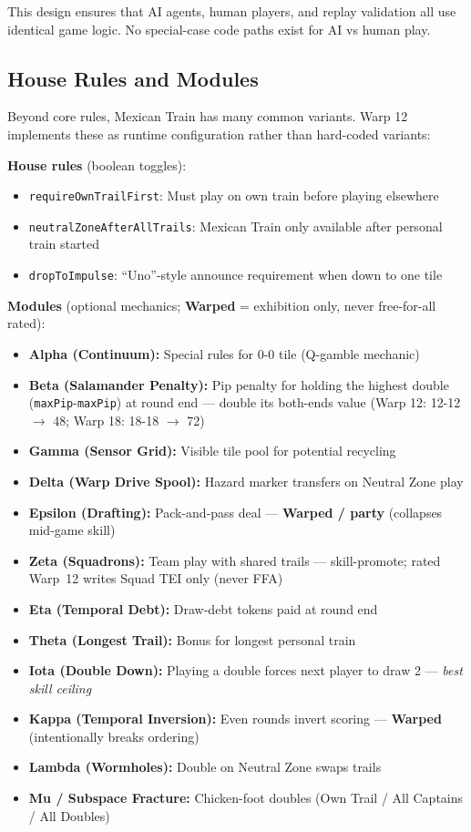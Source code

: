 \documentclass[11pt,letterpaper]{article}
\begin{document}
This design ensures that AI agents, human players, and replay validation all use identical game logic. No special-case code paths exist for AI vs human play.

\subsection{House Rules and Modules}

Beyond core rules, Mexican Train has many common variants. Warp 12 implements these as runtime configuration rather than hard-coded variants:

\textbf{House rules} (boolean toggles):
\begin{itemize}
\item \texttt{requireOwnTrailFirst}: Must play on own train before playing elsewhere
\item \texttt{neutralZoneAfterAllTrails}: Mexican Train only available after personal train started
\item \texttt{dropToImpulse}: ``Uno''-style announce requirement when down to one tile
\end{itemize}

\textbf{Modules} (optional mechanics; \textbf{Warped} = exhibition only, never free-for-all rated):
\begin{itemize}
\item \textbf{Alpha (Continuum):} Special rules for 0-0 tile (Q-gamble mechanic)
\item \textbf{Beta (Salamander Penalty):} Pip penalty for holding the highest
double (\texttt{maxPip}-\texttt{maxPip}) at round end --- double its both-ends
value (Warp 12: 12-12 $\rightarrow$ 48; Warp 18: 18-18 $\rightarrow$ 72)
\item \textbf{Gamma (Sensor Grid):} Visible tile pool for potential recycling
\item \textbf{Delta (Warp Drive Spool):} Hazard marker transfers on Neutral Zone play
\item \textbf{Epsilon (Drafting):} Pack-and-pass deal --- \textbf{Warped / party} (collapses mid-game skill)
\item \textbf{Zeta (Squadrons):} Team play with shared trails --- skill-promote; rated Warp~12 writes Squad TEI only (never FFA)
\item \textbf{Eta (Temporal Debt):} Draw-debt tokens paid at round end
\item \textbf{Theta (Longest Trail):} Bonus for longest personal train
\item \textbf{Iota (Double Down):} Playing a double forces next player to draw 2 --- \emph{best skill ceiling}
\item \textbf{Kappa (Temporal Inversion):} Even rounds invert scoring --- \textbf{Warped} (intentionally breaks ordering)
\item \textbf{Lambda (Wormholes):} Double on Neutral Zone swaps trails
\item \textbf{Mu / Subspace Fracture:} Chicken-foot doubles (Own Trail / All Captains / All Doubles)
\end{itemize}
\end{document}
